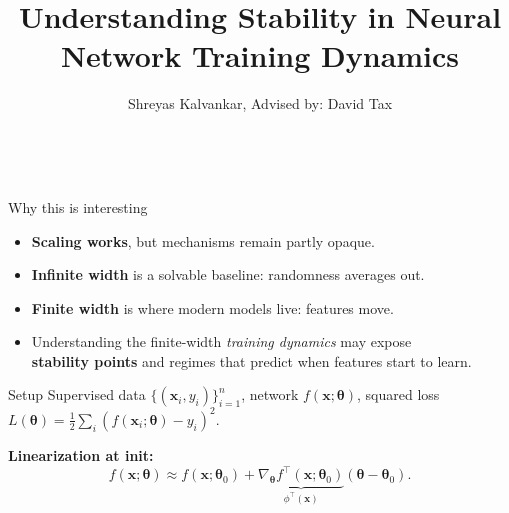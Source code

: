 \documentclass[final,12pt]{beamer}
\title{\bfseries Understanding Stability in Neural Network Training Dynamics}
\author{Shreyas Kalvankar, Advised by: David Tax}
\date{}
\newcommand{\btheta}{\boldsymbol{\theta}}
\newcommand{\bx}{\boldsymbol{x}}
\begin{document}
\begin{frame}[t]
	\vspace*{12mm}
	\begin{columns}[t,totalwidth=\textwidth]
		\begin{column}{.9\textwidth}
			{\bfseries\sffamily\fontsize{50}{54}\selectfont \inserttitle}\par\vspace{4mm}
			{\Large\sffamily\insertauthor \hspace{2em} \normalsize\sffamily \insertinstitute}\par
			\vspace{2mm}
			{\large\sffamily \insertdate}
		\end{column}
	\end{columns}

	\vspace{8mm}

	\begin{columns}[t,totalwidth=\textwidth]

		\begin{column}{.32\textwidth}
			\begin{block}{Why this is interesting}
				\begin{itemize}\setlength{\itemsep}{0.8ex}
					\item \textbf{Scaling works}, but mechanisms remain partly opaque.
					\item \textbf{Infinite width} is a solvable baseline: randomness averages out.
					\item \textbf{Finite width} is where modern models live: features move.
					\item Understanding the finite-width \emph{training dynamics} may expose \\\textbf{stability points} and regimes that predict when features start to learn.
				\end{itemize}
			\end{block}

			\begin{block}{Setup}
				Supervised data $\{(\bx_i,y_i)\}_{i=1}^n$, network $f(\bx;\btheta)$, squared loss $L(\btheta)=\tfrac12\sum_i(f(\bx_i;\btheta)-y_i)^2$.

				\medskip
				\textbf{Linearization at init:}
				\[
					f(\bx;\btheta)\approx f(\bx;\btheta_0)+\underbrace{\nabla_{\btheta}f^{\!\top}(\bx;\btheta_0)}_{\phi^\top(\bx)}(\btheta-\btheta_0).
				\]


\end{block}
\end{column}
\end{columns}
\end{frame}
\end{document}
